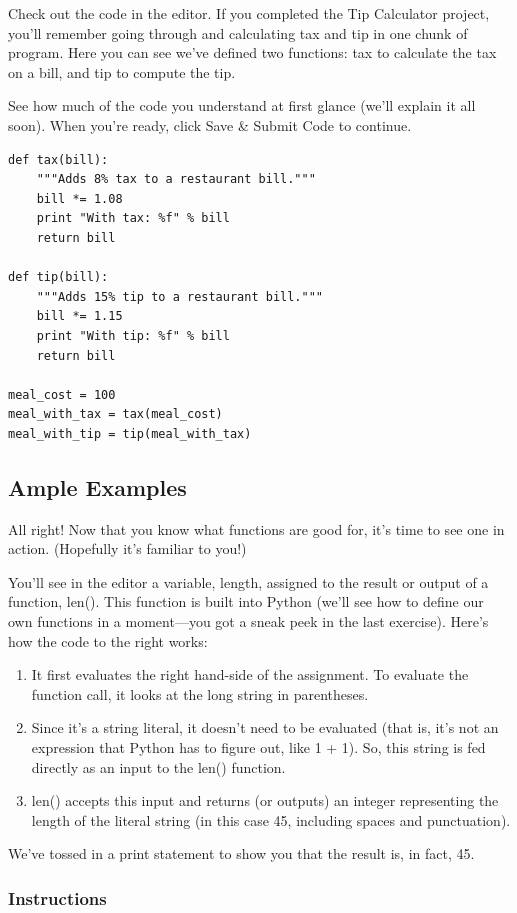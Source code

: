 \documentclass[12pt,a4paper,final,twoside,onecolumn,titlepage]{book}
\begin{document}
Check out the code in the editor. If you completed the Tip Calculator project, you'll remember going through and calculating tax and tip in one chunk of program. Here you can see we've defined two functions: tax to calculate the tax on a bill, and tip to compute the tip.

See how much of the code you understand at first glance (we'll explain it all soon). When you're ready, click Save \& Submit Code to continue.

\begin{lstlisting}
def tax(bill):
    """Adds 8% tax to a restaurant bill."""
    bill *= 1.08
    print "With tax: %f" % bill
    return bill

def tip(bill):
    """Adds 15% tip to a restaurant bill."""
    bill *= 1.15
    print "With tip: %f" % bill
    return bill
    
meal_cost = 100
meal_with_tax = tax(meal_cost)
meal_with_tip = tip(meal_with_tax)
\end{lstlisting}

\subsection{Ample Examples}

All right! Now that you know what functions are good for, it's time to see one in action. (Hopefully it's familiar to you!)

You'll see in the editor a variable, length, assigned to the result or output of a function, len(). This function is built into Python (we'll see how to define our own functions in a moment—you got a sneak peek in the last exercise). Here's how the code to the right works:
\begin{enumerate}
\item    It first evaluates the right hand-side of the assignment. To evaluate the function call, it looks at the long string in parentheses.
\item    Since it's a string literal, it doesn't need to be evaluated (that is, it's not an expression that Python has to figure out, like 1 + 1). So, this string is fed directly as an input to the len() function.
\item    len() accepts this input and returns (or outputs) an integer representing the length of the literal string (in this case 45, including spaces and punctuation).
\end{enumerate}
We've tossed in a print statement to show you that the result is, in fact, 45.
\subsubsection{Instructions}
\end{document}
